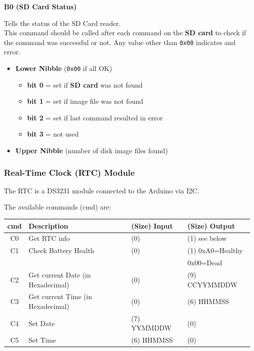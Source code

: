 \documentclass[a4paper,11pt]{article}
\begin{document}
    \textbf{B0 (SD Card Status)}

    Tells the status of the SD Card reader.\\

    This command should be called after each command on the \textbf{SD card} to
    check if the command was successful or not. Any value other than
    \texttt{0x00} indicates and error.

     \begin{itemize}
        \item \textbf{Lower Nibble} (\texttt{0x00} if all OK)
        \begin{itemize}
            \item \textbf{bit 0} = set if \textbf{SD card} was not found
            \item \textbf{bit 1} = set if image file was not found
            \item \textbf{bit 2} = set if last command resulted in error
            \item \textbf{bit 3} = not used
        \end{itemize}
        \item \textbf{Upper Nibble} (number of disk image files found)
    \end{itemize}

    \subsubsection{Real-Time Clock (RTC) Module}

    The RTC is a DS3231 module connected to the Arduino via I2C.

    The available commands (cmd) are:

    \begin{tabular}{| c | m{3.8cm} | m{3cm} | m{3.5cm} | }
        \hline
        \rowcolor{lightgray}
        cmd & Description & (Size) Input & (Size) Output\\
        \hline
        C0 & Get RTC info & (0) & (1) see below\\
        \hline
        C1 & Check Battery Health & (0) & (1) 0xA0=Healthy\\
           &                      &     &     0x00=Dead\\
        \hline
        C2 & Get current Date (in Hexadecimal) & (0) & (9) CCYYMMDDW\\
        \hline
        C3 & Get current Time (in Hexadecimal) & (0) & (6) HHMMSS\\
        \hline
        C4 & Set Date & (7) YYMMDDW & (0)\\
        \hline
        C5 & Set Time & (6) HHMMSS & (0)\\
        \hline
    \end{tabular}
\end{document}
